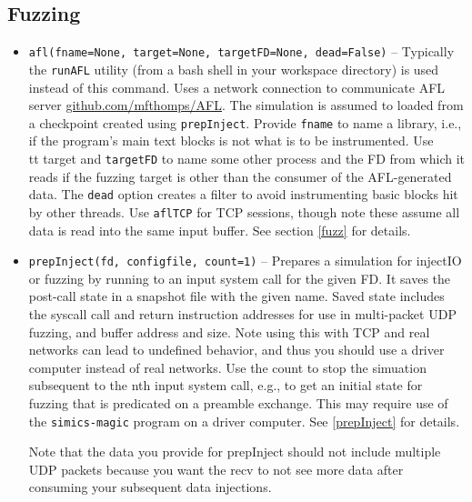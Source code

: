 \documentclass[titlepage]{article}
\begin{document}
\subsection{Fuzzing}
\begin{itemize}

\item{\tt afl(fname=None, target=None, targetFD=None, dead=False)} -- Typically the {\tt runAFL} utility (from a bash shell in your workspace directory) is used instead of this command.  Uses a network connection to communicate AFL server \url{github.com/mfthomps/AFL}.  
The simulation is assumed to loaded from a checkpoint created using {\tt prepInject}.  Provide {\tt fname} to name a library, i.e., if the program's main
text blocks is not what is to be instrumented.
Use {\\tt target} and {\tt targetFD} to name some other process 
and the FD from which it reads if the fuzzing target is other
than the consumer of the AFL-generated data.  The {\tt dead} option creates a filter to avoid instrumenting basic blocks hit by other threads.
Use {\tt aflTCP} for TCP sessions, though note these assume all data is read into
the same input buffer.  
See section \ref{fuzz} for details.

\item{\tt prepInject(fd, configfile, count=1)} -- Prepares a simulation for injectIO or fuzzing by running to an input system call for the given FD.  It saves the post-call state in a snapshot
file with the given name.  Saved state includes the syscall call and return instruction addresses for use in multi-packet UDP fuzzing, and buffer address and size.
Note using this with TCP and real networks can lead to undefined behavior, and thus you should use a driver computer instead of real networks.  
Use the count to stop the simuation subsequent to the nth input system call, e.g., to get an initial state for fuzzing that is predicated on a preamble exchange.
This may require use of the {\tt simics-magic} program on a driver computer.  See \ref{prepInject} for details.

Note that the data you provide for prepInject should not include multiple UDP packets because you want the recv to not see more data after consuming your
subsequent data injections.


\end{itemize}
\end{document}
